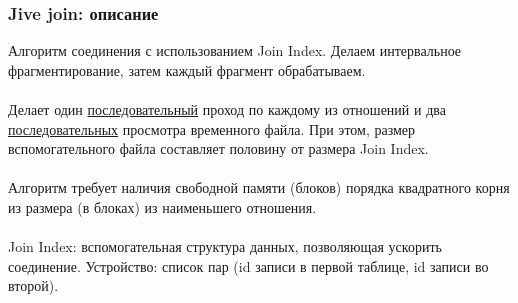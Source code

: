 \documentclass{beamer}
\begin{document}

\begin{frame}
\frametitle{Jive join: описание}

Алгоритм соединения с использованием Join Index. Делаем интервальное фрагментирование, затем каждый фрагмент обрабатываем.\\~\\

Делает один \underline{последовательный} проход по каждому из отношений и два \underline{последовательных} просмотра временного файла. При этом, размер вспомогательного файла составляет половину от размера Join Index.\\~\\

Алгоритм требует наличия свободной памяти (блоков) порядка квадратного корня из размера (в блоках) из наименьшего отношения.\\~\\

Join Index: вспомогательная структура данных, позволяющая ускорить соединение. Устройство: список пар (id записи в первой таблице, id записи во второй).

\end{frame}
\end{document}
